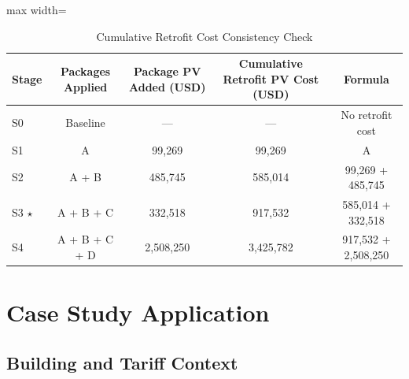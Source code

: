 \documentclass[journal,fleqn]{IEEEtran}
\renewcommand{\arraystretch}{1.08}
\begin{document}
\begin{table}[!t]
\caption{Cumulative Retrofit Cost Consistency Check}
\label{tab:06}
\centering
\scriptsize
\setlength{\tabcolsep}{4pt}
\renewcommand{\arraystretch}{1.16}
\begin{adjustbox}{max width=\textwidth}
\begin{tabular}{@{}lcccc@{}}
\toprule
\textbf{Stage} & \textbf{Packages Applied} & \textbf{Package PV Added (USD)} & \textbf{Cumulative Retrofit PV Cost (USD)} & \textbf{Formula} \\
\midrule
S0 & Baseline & --- & --- & No retrofit cost \\
S1 & A & 99,269 & 99,269 & A \\
S2 & A + B & 485,745 & 585,014 & 99,269 + 485,745 \\
S3 $\star$ & A + B + C & 332,518 & 917,532 & 585,014 + 332,518 \\
S4 & A + B + C + D & 2,508,250 & 3,425,782 & 917,532 + 2,508,250 \\
\bottomrule
\end{tabular}
\end{adjustbox}
\end{table}

\section{Case Study Application}

\subsection{Building and Tariff Context}
\end{document}
